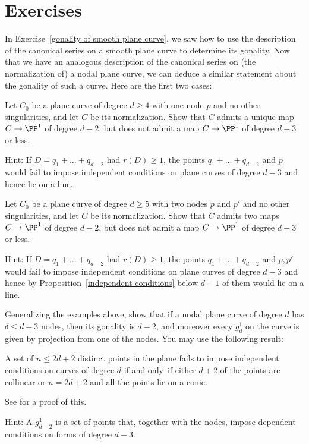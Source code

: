 \section{Exercises}

In Exercise~\ref{gonality of smooth plane curve}, we saw how to use the
%
description of the canonical series on a smooth plane curve to determine its 
gonality.
Now that we have an analogous description of the canonical
series on (the normalization of) a nodal plane curve, we can deduce a
similar statement about the gonality of such a curve. Here are the first
two cases:

\begin{exercise}
Let $C_0$ be a plane curve of degree $d\geq 4$ with one node $p$ and no
other singularities, and let $C$ be its normalization. Show that $C$
admits a unique map $C \to \PP^1$ of degree $d-2$, but does not admit
%
a map $C \to \PP^1$ of degree $d-3$ or less.

Hint: If $D = q_1 + \dots + q_{d-2}$ had $r(D) \geq 1$, the points $q_1 +
\dots + q_{d-2}$ and $p$ would fail to impose 
independent conditions
on
%
plane curves of degree $d-3$ and hence lie on a line.
\end{exercise}

\begin{exercise}
Let $C_0$ be a plane curve of degree $d\geq 5$ with two nodes $p$ and $p'$
and no other singularities, and let $C$ be its normalization. Show that
%
$C$ admits two maps $C \to \PP^1$ of degree $d-2$, but does not admit
a map $C \to \PP^1$ of degree $d-3$ or less.

Hint: If $D = q_1 + \dots + q_{d-2}$ had $r(D) \geq 1$, the points $q_1 +
\dots + q_{d-2}$ and $p, p'$ would fail to impose independent conditions
on plane curves of degree $d-3$ and hence by Proposition~\ref{independent
conditions} below $d-1$ of them would lie on a line.
\end{exercise}

\begin{exercise}
Generalizing the examples above, show that if a nodal plane curve of
degree $d$ has $\delta\leq d+3$ nodes,
then its gonality is $d-2$, and moreover every 
$g^1_d$
%
on the curve is
given by projection from one of the nodes.
You may use the following result:
\begin{proposition}\label{independent conditions}
 A set of $n \leq 2d+ 2$ distinct
points in the plane fails to impose independent conditions on curves
of degree
$d$ if and only~if either $d + 2$ of the points  are collinear or $n =
2d + 2$ and all the points lie
on a conic.
\unif
\end{proposition}

See \cite[p.~302]{MR1376653} for a proof of this.

Hint: A $g^1_{d-2}$ is a set of points that, together with the nodes,
impose dependent conditions on forms of degree $d-3$.
\end{exercise}

